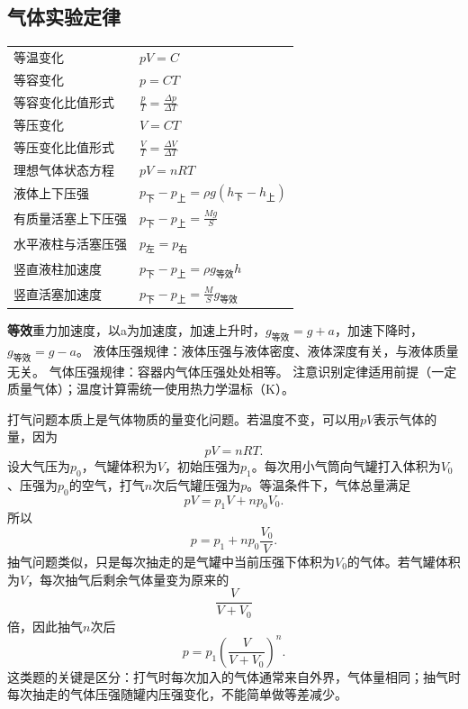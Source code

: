 \subsection{气体实验定律}
\begin{tabularx}{\columnwidth}{XX}
  等温变化&$pV=C$\\
  等容变化&$p=CT$\\
  等容变化比值形式&$\frac{p}{T}=\frac{\Delta p}{\Delta T}$\\
  等压变化&$V=CT$\\
  等压变化比值形式&$\frac{V}{T}=\frac{\Delta V}{\Delta T}$\\
  理想气体状态方程&$pV=nRT$\\
  液体上下压强& $p_{\text{下}}-p_{\text{上}}=\rho g(h_{\text{下}}-h_{\text{上}})$\\
  有质量活塞上下压强& $p_{\text{下}}-p_{\text{上}}=\frac{Mg}{S}$\\
  水平液柱与活塞压强& $p_{\text{左}}=p_{\text{右}}$\\
  竖直液柱加速度& $p_{\text{下}}-p_{\text{上}}=\rho g_{\text{等效}}h$\\
  竖直活塞加速度& $p_{\text{下}}-p_{\text{上}}=\frac{M}{S}g_{\text{等效}}$\\
\end{tabularx}

\begin{formulanotebox}
  \textbf{等效}重力加速度，以a为加速度，加速上升时，$g_{\text{等效}}=g+a$，加速下降时，$g_{\text{等效}}=g-a$。
  液体压强规律：液体压强与液体密度、液体深度有关，与液体质量无关。
  气体压强规律：容器内气体压强处处相等。
  注意识别定律适用前提（一定质量气体）；温度计算需统一使用热力学温标（K）。
\end{formulanotebox}

\begin{casetypebox}[title={\strut\textcolor{white}{\bfseries 常见题型：打气问题}}]
打气问题本质上是气体物质的量变化问题。若温度不变，可以用$pV$表示气体的量，因为
\[
  pV=nRT.
\]
设大气压为$p_0$，气罐体积为$V$，初始压强为$p_1$。每次用小气筒向气罐打入体积为$V_0$、压强为$p_0$的空气，打气$n$次后气罐压强为$p$。等温条件下，气体总量满足
\[
  pV=p_1V+np_0V_0.
\]
所以
\[
  p=p_1+n p_0\frac{V_0}{V}.
\]
抽气问题类似，只是每次抽走的是气罐中当前压强下体积为$V_0$的气体。若气罐体积为$V$，每次抽气后剩余气体量变为原来的
\[
  \frac{V}{V+V_0}
\]
倍，因此抽气$n$次后
\[
  p=p_1\left(\frac{V}{V+V_0}\right)^n.
\]
这类题的关键是区分：打气时每次加入的气体通常来自外界，气体量相同；抽气时每次抽走的气体压强随罐内压强变化，不能简单做等差减少。
\end{casetypebox}

